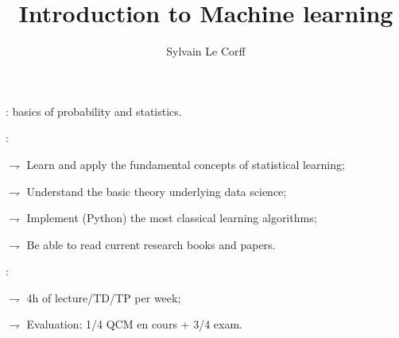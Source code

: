 \documentclass[xcolor={usenames,dvipsnames},handout]{beamer}
\begin{document}
\title[]{Introduction to Machine learning}
\author[]{Sylvain Le Corff}
\date{}

\begin{frame}[plain]
\titlepage
\end{frame}




\begin{frame}
: basics of probability and statistics.

\vspace{.5cm}

:  

\vspace{.2cm}

$\rightharpoondown$ Learn and apply the \alert{fundamental concepts} of statistical learning; 

\vspace{.3cm}

$\rightharpoondown$ Understand the \alert{basic theory} underlying data science;

\vspace{.3cm}


$\rightharpoondown$ Implement (\alert{Python}) the most classical \alert{learning} algorithms;

\vspace{.3cm}

$\rightharpoondown$ Be able to read current research books and papers.

\vspace{.5cm}

: 

\vspace{.2cm}

$\rightharpoondown$ \alert{4h of lecture/TD/TP per week}; 

\vspace{.3cm}

$\rightharpoondown$ \alert{Evaluation}: 1/4 QCM en cours + 3/4 exam.

\end{frame}
\end{document}
